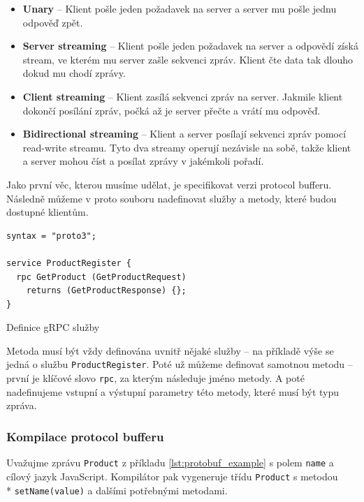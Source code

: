 \documentclass[thesis=M,czech]{FITthesis}[2019/12/23]
\begin{document}
\begin{itemize}
    \item \textbf{Unary} -- Klient pošle jeden požadavek na server a server mu pošle jednu odpověď zpět.
    \item \textbf{Server streaming} -- Klient pošle jeden požadavek na server a odpovědí získá stream, ve kterém mu server zašle sekvenci zpráv. Klient čte data tak dlouho dokud mu chodí zprávy.
    \item \textbf{Client streaming} -- Klient zasílá sekvenci zpráv na server. Jakmile klient dokončí posílání zpráv, počká až je server přečte a vrátí mu odpověď.
    \item \textbf{Bidirectional streaming} -- Klient a server posílají sekvenci zpráv pomocí read-write streamu. Tyto dva streamy operují nezávisle na sobě, takže klient a server mohou číst a posílat zprávy v jakémkoli pořadí.
\end{itemize}

Jako první věc, kterou musíme udělat, je specifikovat verzi protocol bufferu. Následně můžeme v proto souboru nadefinovat služby a metody, které budou dostupné klientům.

\begin{listing}[H]
\begin{verbatim}
syntax = "proto3";

service ProductRegister {
  rpc GetProduct (GetProductRequest) 
    returns (GetProductResponse) {};
}
\end{verbatim}
\caption{Definice gRPC služby}
\label{lst:grpc_service}
\end{listing}

Metoda musí být vždy definována uvnitř nějaké služby -- na příkladě  výše se jedná o službu \texttt{ProductRegister}. Poté už můžeme definovat samotnou metodu -- první je klíčové slovo \texttt{rpc}, za kterým následuje jméno metody. A poté nadefinujeme vstupní a výstupní parametry této metody, které musí být typu zpráva.

\subsubsection*{Kompilace protocol bufferu}
Uvažujme zprávu \texttt{Product} z příkladu \ref{lst:protobuf_example} s polem  \texttt{name} a cílový jazyk JavaScript. Kompilátor pak vygeneruje třídu \texttt{Product} s metodou \\* \texttt{setName(value)} a dalšími potřebnými metodami.
\end{document}
